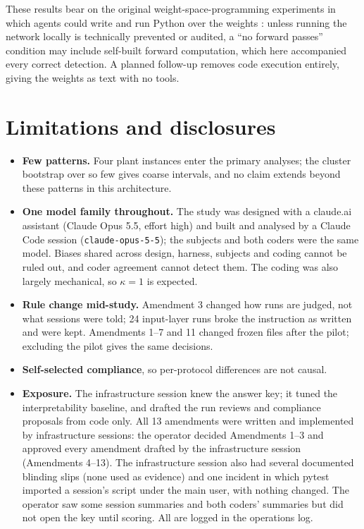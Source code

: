 \documentclass[11pt]{article}
\begin{document}
These results bear on the original weight-space-programming experiments in which agents could write and run Python
over the weights \citep{takehi2026wsp}: unless running the network locally is technically prevented or audited, a ``no
forward passes'' condition may include self-built forward computation, which here accompanied every correct detection.
A planned follow-up removes code execution entirely, giving the weights as text with no tools.

\section{Limitations and disclosures}
\begin{itemize}
\item \textbf{Few patterns.} Four plant instances enter the primary analyses; the cluster bootstrap over so few gives
coarse intervals, and no claim extends beyond these patterns in this architecture.
\item \textbf{One model family throughout.} The study was designed with a claude.ai assistant (Claude Opus 5.5,
effort high) and built and analysed by a Claude Code session (\texttt{claude-opus-5-5}); the subjects and both coders
were the same model. Biases shared across design, harness, subjects and coding cannot be ruled out, and coder
agreement cannot detect them. The coding was also largely mechanical, so $\kappa = 1$ is expected.
\item \textbf{Rule change mid-study.} Amendment 3 changed how runs are judged, not what sessions were told; 24
input-layer runs broke the instruction as written and were kept. Amendments 1--7 and 11 changed frozen files after the
pilot; excluding the pilot gives the same decisions.
\item \textbf{Self-selected compliance}, so per-protocol differences are not causal.
\item \textbf{Exposure.} The infrastructure session knew the answer key; it tuned the interpretability baseline, and drafted
the run reviews and compliance proposals from code only. All 13 amendments were written and implemented by
infrastructure sessions: the operator decided Amendments 1--3 and approved every amendment drafted by the infrastructure
session (Amendments 4--13). The infrastructure session also had several documented blinding slips
(none used as evidence) and one incident in which pytest imported a session's script under the main user, with
nothing changed. The operator saw some session summaries and both coders' summaries but did not open the key until
scoring. All are logged in the operations log.
\end{itemize}
\end{document}
